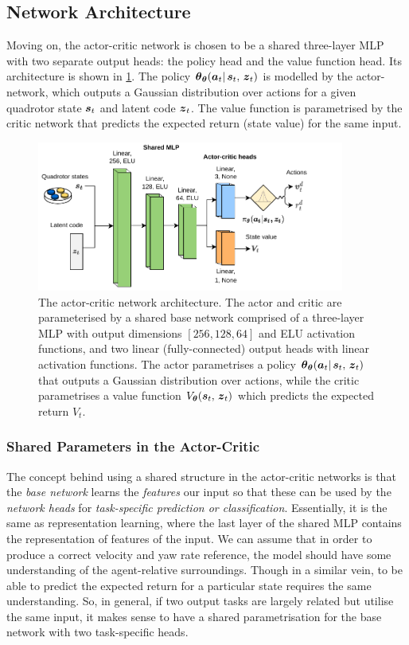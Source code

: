 \subsection{Network Architecture}
\label{subsec:5_MLP_architecture}
Moving on, the actor-critic network is chosen to be a shared three-layer MLP with two separate output heads: the policy head and the value function head. Its architecture is shown in \cref{fig:5_actor_critic}. The policy $\boldsymbol{\theta}_{\boldsymbol{\theta}}({\boldsymbol{a}}_t |\, {\boldsymbol{s}}_t, \, {\boldsymbol{z}}_t)$ is modelled by the actor-network, which outputs a Gaussian distribution over actions for a given quadrotor state ${\boldsymbol{s}}_t$ and latent code ${\boldsymbol{z}}_t$. The value function is parametrised by the critic network that predicts the expected return (state value) for the same input.
\begin{figure}[hbt]
    \centering
    \includegraphics[width=0.9\textwidth]{figures/5_/5_actor_critic.pdf}
    \caption{The actor-critic network architecture. The actor and critic are parameterised by a shared base network comprised of a three-layer MLP with output dimensions $[256, 128, 64]$ and ELU activation functions, and two linear (fully-connected) output heads with linear activation functions. The actor parametrises a policy $\boldsymbol{\theta}_{\boldsymbol{\theta}}({\boldsymbol{a}}_t |\, {\boldsymbol{s}}_t, \, {\boldsymbol{z}}_t)$ that outputs a Gaussian distribution over actions, while the critic parametrises a value function $V_{\boldsymbol{\theta}} ({\boldsymbol{s}}_t, \, {\boldsymbol{z}}_t)$ which predicts the expected return $V_t$.}
    \label{fig:5_actor_critic}
\end{figure}

\subsubsection{Shared Parameters in the Actor-Critic}
The concept behind using a shared structure in the actor-critic networks is that the \textit{base network} learns the \textit{features} our input so that these can be used by the \textit{network heads} for \textit{task-specific prediction or classification}. Essentially, it is the same as representation learning, where the last layer of the shared MLP contains the representation of features of the input. 
We can assume that in order to produce a correct velocity and yaw rate reference, the model should have some understanding of the agent-relative surroundings. Though in a similar vein, to be able to predict the expected return for a particular state requires the same understanding. So, in general, if two output tasks are largely related but utilise the same input, it makes sense to have a shared parametrisation for the base network with two task-specific heads.


